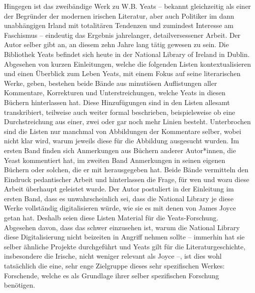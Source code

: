 \documentclass[a4paper,
fontsize=11pt,
oneside,
numbers=noperiodatend,
parskip=half-,
bibliography=totoc,
final
]{scrartcl}
\begin{document}
Hingegen ist das zweibändige Werk zu W.B. Yeats -- bekannt gleichzeitig
als einer der Begründer der modernen irischen Literatur, aber auch
Politiker im dann unabhängigen Irland mit totalitären Tendenzen und
zumindest Interesse am Faschismus -- eindeutig das Ergebnis jahrelanger,
detailversessener Arbeit. Der Autor selber gibt an, an diesem zehn Jahre
lang tätig gewesen zu sein. Die Bibliothek Yeats befindet sich heute in
der National Library of Ireland in Dublin. Abgesehen von kurzen
Einleitungen, welche die folgenden Listen kontextualisieren und einen
Überblick zum Leben Yeats, mit einem Fokus auf seine literarischen
Werke, geben, bestehen beide Bände aus minutiösen Auflistungen aller
Kommentare, Korrekturen und Unterstreichungen, welche Yeats in diesen
Büchern hinterlassen hat. Diese Hinzufügungen sind in den Listen
allesamt transkribiert, teilweise auch weiter formal beschrieben,
beispielsweise ob eine Durchstreichung aus einer, zwei oder gar noch
mehr Linien besteht. Unterbrochen sind die Listen nur manchmal von
Abbildungen der Kommentare selber, wobei nicht klar wird, warum jeweils
diese für die Abbildung ausgesucht wurden. Im ersten Band finden sich
Anmerkungen aus Büchern anderer Autor*innen, die Yeast kommentiert hat,
im zweiten Band Anmerkungen in seinen eigenen Büchern oder solchen, die
er mit herausgegeben hat. Beide Bände vermitteln den Eindruck
pedantischer Arbeit und hinterlassen die Frage, für wen und wozu diese
Arbeit überhaupt geleistet wurde. Der Autor postuliert in der Einleitung
im ersten Band, dass es unwahrscheinlich sei, dass die National Library
je diese Werke vollständig digitalisieren würde, wie sie es mit denen
von James Joyce getan hat. Deshalb seien diese Listen Material für die
Yeats-Forschung. Abgesehen davon, dass das schwer einzusehen ist, warum
die National Library diese Digitalisierung nicht beizeiten in Angriff
nehmen sollte -- immerhin hat sie selber ähnliche Projekte durchgeführt
und Yeats gilt für die Literaturgeschichte, insbesondere die Irische,
nicht weniger relevant als Joyce --, ist dies wohl tatsächlich die eine,
sehr enge Zielgruppe dieses sehr spezifischen Werkes: Forschende, welche
es als Grundlage ihrer selber spezifischen Forschung benötigen.
\end{document}
